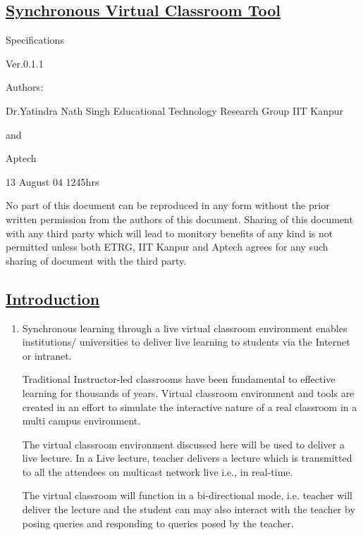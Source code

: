 \documentclass{article}
\begin{document}
\begin{center}
\section*{\underline{Synchronous Virtual Classroom Tool}} 
 
                                     Specifications 
 
                                      Ver.0.1.1 
 
                                        Authors: 
 
                               Dr.Yatindra Nath Singh 
                        Educational Technology Research Group 
                                       IIT Kanpur 
 
                                         and 
 
                                       Aptech 
 
                                 13 August 04 1245hrs 
 
No part of this document can be reproduced in any form without the prior written permission from the authors of this document. Sharing of this document with any third party which will lead to monitory benefits of any kind is not permitted unless both ETRG, IIT Kanpur and Aptech agrees for any such sharing of document with the third party.
\end{center}
\subsection*{\underline{Introduction}}
\begin{enumerate}
\item[{}{}]
  
Synchronous learning through a live virtual classroom environment enables institutions/ universities to deliver live learning to students via the Internet or 
intranet.

 Traditional Instructor-led classrooms have been fundamental to effective learning for thousands of years. Virtual classroom environment and tools are created in an effort to simulate the interactive nature of a real classroom in a multi campus environment. 

 The virtual classroom environment discussed here will be used to deliver a live lecture. In a Live lecture, teacher delivers a lecture which is transmitted to all the attendees on multicast network live  i.e., in real-time.
 
The virtual classroom will function in a bi-directional mode, i.e. teacher will deliver the lecture and the student can may also interact with the teacher by posing queries and responding to queries posed by the teacher.
\end{enumerate}
\end{document}
